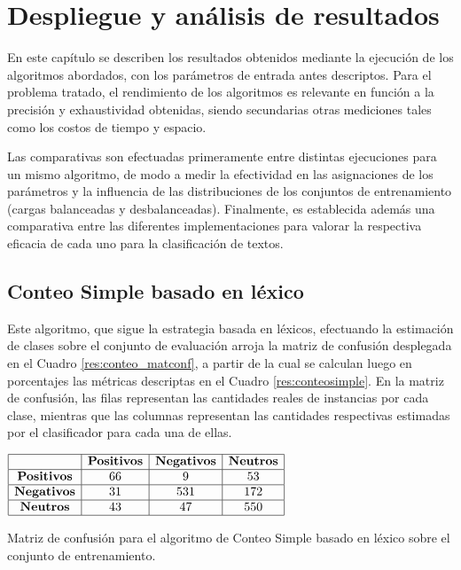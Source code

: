 \chapter{Despliegue y an\'alisis de resultados}\label{resultados}

En este cap\'itulo se describen los resultados obtenidos mediante la ejecuci\'on de los algoritmos abordados, con los par\'ametros de entrada antes descriptos. Para el problema tratado, el rendimiento de los algoritmos es relevante en funci\'on a la precisi\'on y exhaustividad obtenidas, siendo secundarias otras mediciones tales como los costos de tiempo y espacio.
\newline

Las comparativas son efectuadas primeramente entre distintas ejecuciones para un mismo algoritmo, de modo a medir la efectividad en las asignaciones de los par\'ametros y la influencia de las distribuciones de los conjuntos de entrenamiento (cargas balanceadas y desbalanceadas). Finalmente, es establecida adem\'as una comparativa entre las diferentes implementaciones para valorar la respectiva eficacia de cada uno para la clasificaci\'on de textos.

\section{Conteo Simple basado en l\'exico}

Este algoritmo, que sigue la estrategia basada en l\'exicos, efectuando la estimaci\'on de clases sobre el conjunto de evaluaci\'on arroja la matriz de confusi\'on desplegada en el Cuadro \ref{res:conteo_matconf}, a partir de la cual se calculan luego en porcentajes las m\'etricas descriptas en el Cuadro \ref{res:conteosimple}. En la matriz de confusi\'on, las filas representan las cantidades reales de instancias por cada clase, mientras que las columnas representan las cantidades respectivas estimadas por el clasificador para cada una de ellas.
\newline

\begin{table}[htb] 
\centering

$
\begin{array}{|c|c|c|c|}
      \hline
       & \mathbf{Positivos} & \mathbf{Negativos} & \mathbf{Neutros}	\\
      \hline
      \mathrm{\mathbf{Positivos}} & 66 & 9 & 53 \\
      \hline
      \mathrm{\mathbf{Negativos}} & 31 & 531 & 172 \\
      \hline
      \mathrm{\mathbf{Neutros}}	  & 43 & 47 & 550 \\
      \hline
\end{array}
$
\caption{Matriz de confusi\'on para el algoritmo de Conteo Simple basado en l\'exico sobre el conjunto de entrenamiento.}
\label{res:conteo_matconf}
\end{table}

